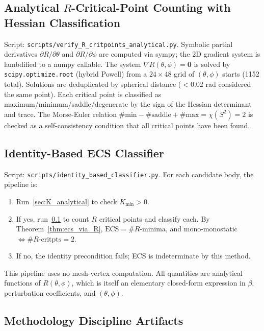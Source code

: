 \documentclass[11pt,a4paper]{article}
\begin{document}
\subsection{Analytical $R$-Critical-Point Counting with Hessian Classification}
\label{sec:R_critpoints}

Script: \texttt{scripts/verify\_R\_critpoints\_analytical.py}.
Symbolic partial derivatives $\partial R / \partial \theta$ and
$\partial R / \partial \phi$ are computed via sympy; the 2D gradient
system is lambdified to a numpy callable. The system
$\nabla R(\theta,\phi) = \mathbf{0}$ is solved by
\texttt{scipy.optimize.root} (hybrid Powell) from a $24 \times 48$
grid of $(\theta, \phi)$ starts (1152 total). Solutions are
deduplicated by spherical distance ($< 0.02$ rad considered the
same point). Each critical point is classified as
maximum/minimum/saddle/degenerate by the sign of the Hessian
determinant and trace. The Morse-Euler relation
$\#\text{min} - \#\text{saddle} + \#\text{max} = \chi(S^2) = 2$
is checked as a self-consistency condition that all critical points
have been found.

\subsection{Identity-Based ECS Classifier}
\label{sec:identity_classifier}

Script: \texttt{scripts/identity\_based\_classifier.py}.
For each candidate body, the pipeline is:
\begin{enumerate}[nosep,leftmargin=*]
\item Run~\ref{sec:K_analytical} to check $K_{\min} > 0$.
\item If yes, run~\ref{sec:R_critpoints} to count $R$ critical points
  and classify each. By Theorem~\ref{thm:ecs_via_R},
  $\mathrm{ECS} = \#R\text{-minima}$, and mono-monostatic
  $\Leftrightarrow \#R\text{-critpts} = 2$.
\item If no, the identity precondition fails; ECS is indeterminate
  by this method.
\end{enumerate}
This pipeline uses no mesh-vertex computation. All quantities are
analytical functions of $R(\theta,\phi)$, which is itself an
elementary closed-form expression in $\beta$, perturbation
coefficients, and $(\theta, \phi)$.

\subsection{Methodology Discipline Artifacts}
\label{sec:methodology_artifacts}
\end{document}
